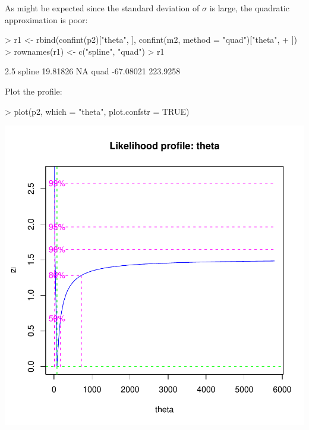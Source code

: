\documentclass{article}
\begin{document}
As might be expected since the standard deviation
of $\sigma$ is large, the quadratic approximation is
poor:

\begin{Schunk}
\begin{Sinput}
> r1 <- rbind(confint(p2)["theta", ], confint(m2, method = "quad")["theta", 
+     ])
> rownames(r1) <- c("spline", "quad")
> r1
\end{Sinput}
\begin{Soutput}
           2.5 %
spline  19.81826       NA
quad   -67.08021 223.9258
\end{Soutput}
\end{Schunk}

Plot the profile:
\begin{Schunk}
\begin{Sinput}
> plot(p2, which = "theta", plot.confstr = TRUE)
\end{Sinput}
\end{Schunk}
\includegraphics{mle2-025}
\end{document}
